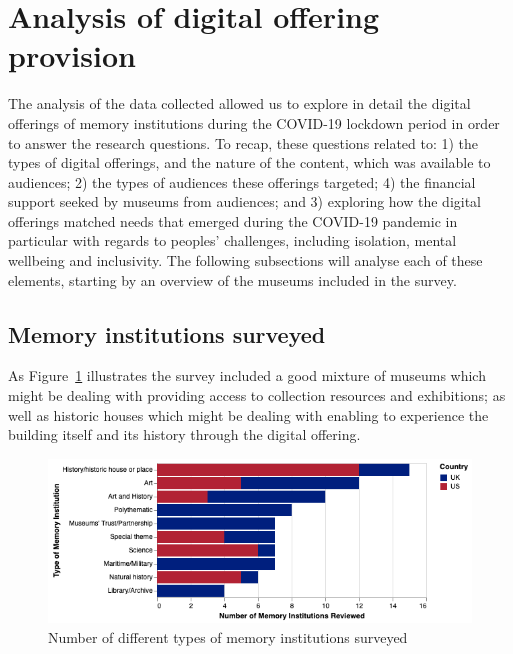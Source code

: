 \documentclass{egpubl}
\begin{document}
\section{Analysis of digital offering provision }
The analysis of the data collected allowed us to explore in detail the digital offerings of memory institutions during the COVID-19 lockdown period in order to answer the research questions. To recap, these questions related to: 1) the types of digital offerings, and the nature of the content, which was available to audiences; 2) the types of audiences these offerings targeted; 4) the financial support seeked by museums from audiences; and 3) exploring how the digital offerings matched needs that emerged during the COVID-19 pandemic in particular with regards to peoples’ challenges, including isolation, mental wellbeing and inclusivity. The following subsections will analyse each of these elements, starting by an overview of the museums included in the survey.

\subsection{Memory institutions surveyed}
As Figure~\ref{fig:MType} illustrates the survey included a good mixture of museums which might be dealing with providing access to collection resources and exhibitions; as well as historic houses which might be dealing with enabling to experience the building itself and its history through the digital offering. 


\begin{figure}[h]
  \centering
  \includegraphics[width=\linewidth]{images/museumtype.png}
  \caption{\label{fig:MType}
           Number of different types of memory institutions surveyed}
\end{figure}
\end{document}
